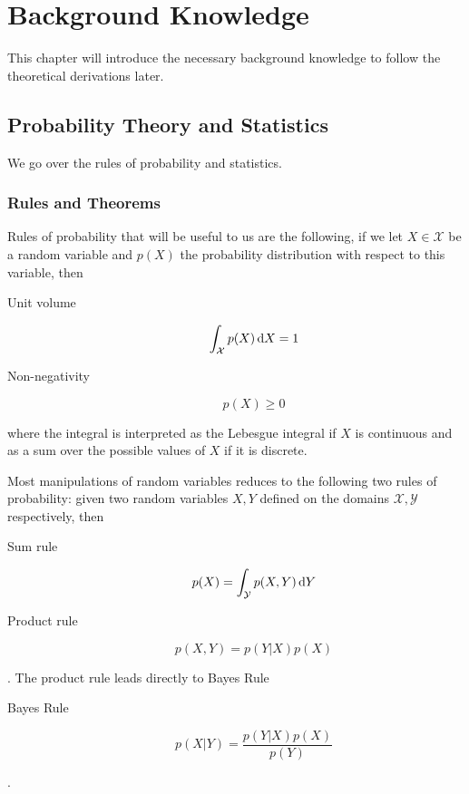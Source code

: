 \chapter{Background Knowledge}
\label{BackgroundKnowledgeCh}

This chapter will introduce the necessary background knowledge to follow the
theoretical derivations later.

\section{Probability Theory and Statistics}

We go over the rules of probability and statistics.

\subsection{Rules and Theorems}

Rules of probability that will be useful to us are the following, if we let $X
\in \mathcal{X}$ be a random variable and $p(X)$ the probability distribution with
respect to this variable, then
\begin{description}
\item[Unit volume]
  \begin{equation}
    \label{eq:unit_vol_prob_axiom}
    \int_{\mathcal{X}}p(X) \dif X = 1
  \end{equation}
\item[Non-negativity]
  \begin{equation}
    \label{eq:non_neg_of_prob}
    p(X) \geq 0
  \end{equation}
\end{description}
where the integral is interpreted as the Lebesgue integral if $X$ is continuous and as
a sum over the possible values of $X$ if it is discrete.

Most manipulations of random variables reduces to the following two rules of
probability: given two random variables $X, Y$ defined on the domains $\mathcal{X}, \mathcal{Y}$ respectively, then
\begin{description}
\item[Sum rule]
  \begin{equation}
    \label{eq:sum_rule}
    p(X) = \int_{\mathcal{Y}}p(X, Y) \dif Y
  \end{equation}
\item[Product rule]
  \begin{equation}
    \label{eq:product_rule}
    p(X, Y) = p(Y | X)p(X)
  \end{equation}
\end{description}.
The product rule leads directly to Bayes Rule
\begin{description}
\item[Bayes Rule]
  \begin{equation}
    \label{eq:bayes_rule}
    p(X | Y) = \frac{p(Y | X)p(X)}{p(Y)}
  \end{equation}
\end{description}.

